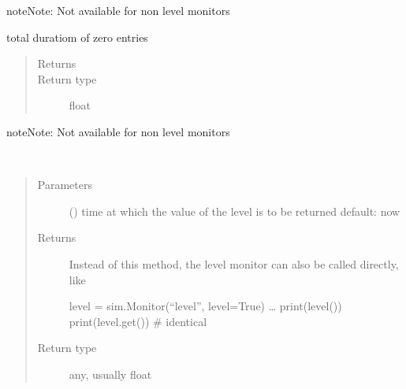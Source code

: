 \documentclass[letterpaper,10pt,english]{sphinxmanual}
\begin{document}
\begin{fulllineitems}
\begin{fulllineitems}
\begin{sphinxadmonition}{note}{Note:}
Not available for non level monitors
\end{sphinxadmonition}

\end{fulllineitems}


\begin{fulllineitems}
\label{\detokenize{Reference:salabim.Monitor.duration_zero}}
total duratiom of zero entries
\begin{quote}\begin{description}
\item[{Returns}] \leavevmode
{}

\item[{Return type}] \leavevmode
float

\end{description}\end{quote}

\begin{sphinxadmonition}{note}{Note:}
Not available for non level monitors
\end{sphinxadmonition}

\end{fulllineitems}


\begin{fulllineitems}
\label{\detokenize{Reference:salabim.Monitor.get}}~\begin{quote}\begin{description}
\item[{Parameters}] \leavevmode
{} () \textendash{} time at which the value of the level is to be returned 
default: now

\item[{Returns}] \leavevmode

 \textendash{} Instead of this method, the level monitor can also be called directly, like 

level = sim.Monitor(“level”, level=True) 
… 
print(level()) 
print(level.get())  \# identical 


\item[{Return type}] \leavevmode
any, usually float


\end{description}
\end{quote}
\end{fulllineitems}
\end{fulllineitems}
\end{document}
